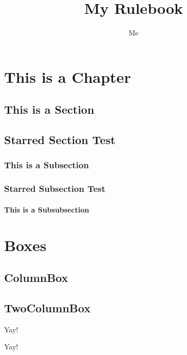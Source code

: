 \documentclass{ShadowTeXSR5}
\title{My Rulebook}
\author{Me}
\begin{document}
\srmaketitle
\tableofcontents


\chapter{This is a Chapter}
\lipsum
\lipsum
\section{This is a Section}
\lipsum[1]
\section*{Starred Section Test}
\lipsum[2]
\subsection{This is a Subsection}
\lipsum[2-5]
\subsection*{Starred Subsection Test}
\lipsum[1-4]
\subsubsection{This is a Subsubsection}
\lipsum
\chapter{Boxes}
\lipsum
\lipsum
\section{ColumnBox}
\lipsum[1]
\begin{columnbox}[l]
\lipsum[1]
\end{columnbox}
\section{TwoColumnBox}
\lipsum
\begin{twocolbox}
\centering\Huge Yay!\\
\normalsize\lipsum[1-3]
\end{twocolbox}
\lipsum
\begin{twocolbox}
\centering\Huge Yay!\\
\normalsize\lipsum[1-3]
\end{twocolbox}
\lipsum
\lipsum
\lipsum
\end{document}
